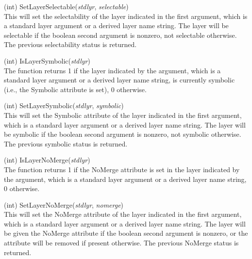 \begin{description}
\item{(int) \vt SetLayerSelectable({\it stdlyr\/}, {\it selectable\/})}\\
This will set the selectability of the layer indicated in the first
argument, which is a standard layer argument or a derived layer name
string.  The layer will be selectable if the boolean second argument
is nonzero, not selectable otherwise.  The previous selectability
status is returned.

\item{(int) \vt IsLayerSymbolic({\it stdlyr\/})}\\
The function returns 1 if the layer indicated by the argument, which
is a standard layer argument or a derived layer name string, is
currently symbolic (i.e., the {\vt Symbolic} attribute is set), 0
otherwise.

\item{(int) \vt SetLayerSymbolic({\it stdlyr\/}, {\it symbolic\/})}\\
This will set the {\vt Symbolic} attribute of the layer indicated in
the first argument, which is a standard layer argument or a derived
layer name string.  The layer will be symbolic if the boolean second
argument is nonzero, not symbolic otherwise.  The previous symbolic
status is returned.

\item{(int) \vt IsLayerNoMerge({\it stdlyr\/})}\\
The function returns 1 if the {\vt NoMerge} attribute is set in the
layer indicated by the argument, which is a standard layer argument or
a derived layer name string, 0 otherwise.

\item{(int) \vt SetLayerNoMerge({\it stdlyr\/}, {\it nomerge\/})}\\
This will set the {\vt NoMerge} attribute of the layer indicated in
the first argument, which is a standard layer argument or a derived
layer name string.  The layer will be given the {\vt NoMerge}
attribute if the boolean second argument is nonzero, or the attribute
will be removed if present otherwise.  The previous {\vt NoMerge}
status is returned.


\end{description}

